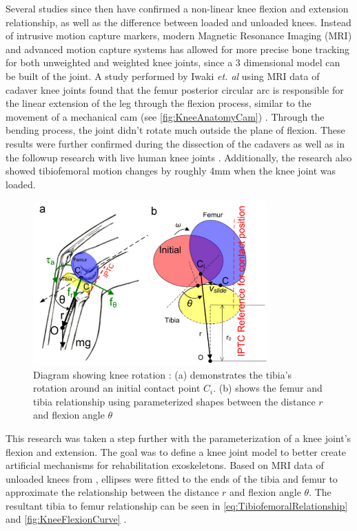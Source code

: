 Several studies since then have confirmed a non-linear knee flexion and extension relationship, as well as the difference between loaded and unloaded knees. Instead of intrusive motion capture markers, modern Magnetic Resonance Imaging (MRI) and advanced motion capture systems \cite{ModelAnalysisDeepKneeFlexion} has allowed for more precise bone tracking for both unweighted and weighted knee joints, since a 3 dimensional model can be built of the joint. A study performed by Iwaki \textit{et. al} using MRI data of cadaver knee joints found that the femur posterior circular arc is responsible for the linear extension of the leg through the flexion process, similar to the movement of a mechanical cam (see \autoref{fig:KneeAnatomyCam}) \cite{MRIKneeShape_Unloaded}. Through the bending process, the joint didn't rotate much outside the plane of flexion. These results were further confirmed during the dissection of the cadavers as well as in the followup research with live human knee joints \cite{MRIKneeShape_Loaded}. Additionally, the research also showed tibiofemoral motion changes by roughly 4mm when the knee joint was loaded.

\begin{figure}[ht!]
    \centering
    \includegraphics[width=0.8\textwidth]{Figures/Background/KneeParameterization.png}
    \caption{Diagram showing knee rotation \cite{KinDynKneeJoint}: (a) demonstrates the tibia's rotation around an initial contact point \(C_i\). (b) shows the femur and tibia relationship using parameterized shapes between the distance \(r\) and flexion angle \(\theta\)}
    \label{fig:KneeParameterization}
\end{figure}

This research was taken a step further with the parameterization of a knee joint's flexion and extension. The goal was to define a knee joint model to better create artificial mechanisms for rehabilitation exoskeletons. Based on MRI data of unloaded knees from \cite{MRIKneeShape_Unloaded}, ellipses were fitted to the ends of the tibia and femur to approximate the relationship between the distance \(r\) and flexion angle \(\theta\). The resultant tibia to femur relationship can be seen in \autoref{eq:TibiofemoralRelationship} and \autoref{fig:KneeFlexionCurve} \cite{KinDynKneeJoint}.

